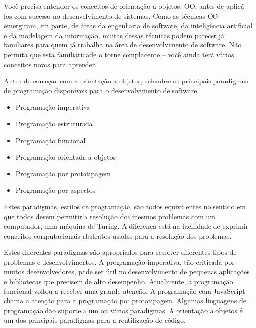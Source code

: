 Você precisa entender os conceitos de orientação a objetos, OO, antes de aplicá-los com sucesso no desenvolvimento de sistemas. Como as técnicas OO emergiram, em parte, de áreas da engenharia de software, da inteligência artificial e da modelagem da informação, muitas dessas técnicas podem parecer já familiares para quem já trabalha na área de desenvolvimento de software. Não permita que esta familiaridade o torne complacente -- você ainda terá vários conceitos novos para aprender.

Antes de começar com a orientação a objetos, relembre os principais paradigmas de programação disponíveis para o desenvolvimento de software.
\begin{itemize}
\item Programação imperativa
\item Programação estruturada
\item Programação funcional
\item Programação orientada a objetos
\item Programação por prototipagem
\item Programação por aspectos
\end{itemize}

Estes paradigmas, estilos de programação, são todos equivalentes no sentido em que todos devem permitir a resolução dos mesmos problemas com um computador, uma máquina de Turing. A diferença está na facilidade de exprimir conceitos computacionais abstratos usados para a resolução dos problemas.

Estes diferentes paradigmas são apropriados para resolver diferentes tipos de problemas e desenvolvimentos. A programação imperativa, tão criticada por muitos desenvolvedores, pode ser útil no desenvolvimento de pequenas aplicações e bibliotecas que precisem de alto desempenho. Atualmente, a programação funcional voltou a receber uma grande atenção. A programação com JavaScript chama a atenção para a programação por prototipagem. Algumas linguagens de programação dão suporte a um ou vários paradigmas. A orientação a objetos é um dos principais paradigmas para a reutilização de código.

